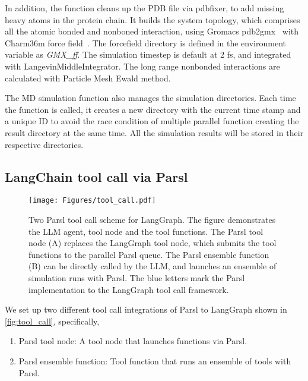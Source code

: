 In addition, the function cleans up the PDB file via pdbfixer, to add missing heavy atoms in the protein chain. 
It builds the system topology, which comprises all the atomic bonded and nonboned interaction, using Gromacs pdb2gmx~\cite{abraham2015gromacs} with Charm36m force field~\cite{huang2013charmm36}. 
The forcefield directory is defined in the environment variable as \emph{GMX\_ff}. 
The simulation timestep is default at 2 fs, and integrated with LangevinMiddleIntegrator. 
The long range nonbonded interactions are calculated with Particle Mesh Ewald method.~\cite{darden1993particle}

The MD simulation function also manages the simulation directories. 
Each time the function is called, it creates a new directory with the current time stamp and a unique ID to avoid the race condition of multiple parallel function creating the result directory at the same time. 
All the simulation results will be stored in their respective directories. 


\subsection{LangChain tool call via Parsl}


\begin{figure}
    \centering
    \texttt{[image: Figures/tool\_call.pdf]}
    \caption{Two Parsl tool call scheme for LangGraph. The figure demonstrates the LLM agent, tool node and the tool functions. The Parsl tool node (A) replaces the LangGraph tool node, which submits the tool functions to the parallel Parsl queue. The Parsl ensemble function (B) can be directly called by the LLM, and launches an ensemble of simulation runs with Parsl. The blue letters mark the Parsl implementation to the LangGraph tool call framework. }
    \Description{}
    \label{fig:tool_call}
\end{figure}

We set up two different tool call integrations of Parsl to LangGraph shown in \autoref{fig:tool_call}, specifically,
\begin{enumerate}
    \item Parsl tool node: A tool node that launches functions via Parsl. 
    \item Parsl ensemble function: Tool function that runs an ensemble of tools with Parsl. 
\end{enumerate}

